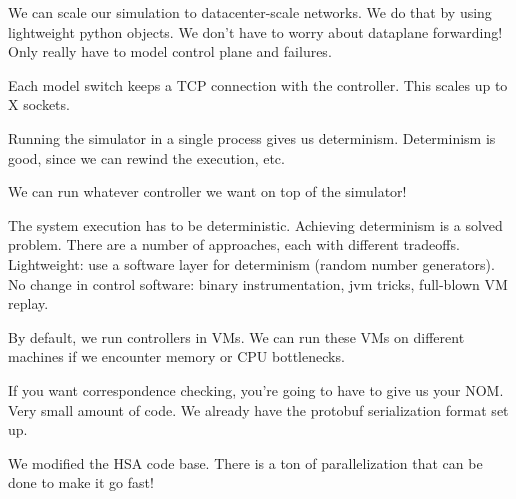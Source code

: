 We can scale our simulation to datacenter-scale networks. We do that by using lightweight python objects. We don't have to worry
about dataplane forwarding! Only really have to model control plane and failures.

Each model switch keeps a TCP connection with the controller. This scales up
to X sockets.

Running the simulator in a single process gives us determinism. Determinism is
good, since we can rewind the execution, etc.


We can run whatever controller we want on top of the simulator!

The system execution has to be deterministic. Achieving determinism 
is a solved problem. There are a number of approaches, each with different
tradeoffs. Lightweight: use a software layer for determinism (random number
generators). No change in control software: binary instrumentation, jvm
tricks, full-blown VM replay.

By default, we run controllers in VMs. We can run these VMs on different
machines if we encounter memory or CPU bottlenecks.

If you want correspondence checking, you're going to have to give us your NOM.
Very small amount of code. We already have the protobuf serialization format
set up.


We modified the HSA code base. There is a ton of parallelization that can be
done to make it go fast!
